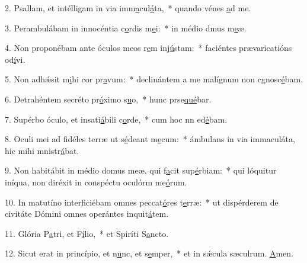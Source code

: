 2. Psallam, et intélligam in via imm\uline{a}cul\uline{á}ta,~* quando vénes \uline{a}d me.\par 
3. Perambulábam in innocéntia c\uline{o}rdis m\uline{e}i:~* in médio dmus m\uline{e}æ.\par 
4. Non proponébam ante óculos meos r\uline{e}m inj\uline{ú}stam:~* faciéntes prævaricatións od\uline{í}vi.\par 
5. Non adhǽsit m\uline{i}hi cor pr\uline{a}vum:~* declinántem a me malígnum non cgnosc\uline{é}bam.\par 
6. Detrahéntem secréto pr\uline{ó}ximo s\uline{u}o,~* hunc prse\uline{qué}bar.\par 
7. Supérbo óculo, et insati\uline{á}bili c\uline{o}rde,~* cum hoc nn ed\uline{é}bam.\par 
8. Oculi mei ad fidéles terræ ut s\uline{é}deant m\uline{e}cum:~* ámbulans in via immaculáta, hic mihi mnistr\uline{á}bat.\par 
9. Non habitábit in médio domus meæ, qui f\uline{a}cit sup\uline{é}rbiam:~* qui lóquitur iníqua, non diréxit in conspéctu oculórm me\uline{ó}rum.\par 
10. In matutíno interficiébam omnes peccat\uline{ó}res t\uline{e}rræ:~* ut dispérderem de civitáte Dómini omnes operántes inquit\uline{á}tem.\par 
11. Glória P\uline{a}tri, et F\uline{í}lio,~* et Spiríti S\uline{a}ncto.\par 
12. Sicut erat in princípio, et n\uline{u}nc, et s\uline{e}mper,~* et in sǽcula sæculrum. \uline{A}men.\par 
